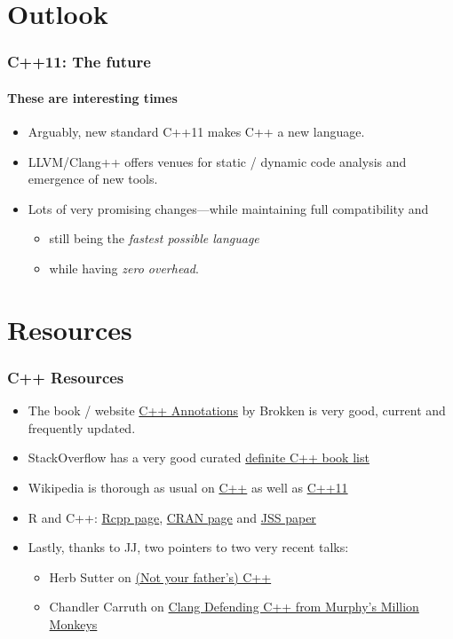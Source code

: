 \documentclass[dvipsnames,handout,compress,pdflatex,beamer]{beamer}
\begin{document}
\section{Outlook}
\begin{frame}
  \frametitle{C++11: The future}
  \framesubtitle{These are interesting times}

  \begin{itemize}[<+->]
  \item Arguably, new standard C++11 makes C++ a new language.
  \item LLVM/Clang++ offers venues for static / dynamic code
    analysis and emergence of new tools.
  \item Lots of very promising changes---while maintaining full
    compatibility and 
    \begin{itemize}
      \item still being the \emph{fastest possible language} 
      \item while having \emph{zero overhead}.
    \end{itemize}
  \end{itemize}
\end{frame}  

\section{Resources}
\begin{frame}
  \frametitle{C++ Resources}
  \begin{itemize}
  \item The book / website
    \href{http://www.icce.rug.nl/documents/cplusplus/}{C++ Annotations} by
    Brokken is very good, current and frequently updated.
  \item StackOverflow has a very good curated
    \href{http://stackoverflow.com/questions/388242/the-definitive-c-book-guide-and-list}{definite C++ book list}
  \item Wikipedia is thorough as usual on
    \href{http://en.wikipedia.org/wiki/C\%2B\%2B}{C++} as well as 
    \href{http://en.wikipedia.org/wiki/C\%2B\%2B11}{C++11}
  \item R and C++: 
    \href{http://dirk.eddelbuettel.com/code/rcpp.html}{Rcpp page}, 
    \href{http://cran.r-project.org/package=Rcpp}{CRAN page} and 
    \href{http://www.jstatsoft.org/v40/i08/}{JSS paper}
  \item Lastly, thanks to JJ, two pointers to two very recent talks: 
    \begin{itemize}
    \item Herb Sutter on \href{http://channel9.msdn.com/Events/Lang-NEXT/Lang-NEXT-2012/-Not-Your-Father-s-C-}{(Not your father's) C++}
    \item Chandler Carruth on \href{http://channel9.msdn.com/Events/GoingNative/GoingNative-2012/Clang-Defending-C-from-Murphy-s-Million-Monkeys}{Clang Defending C++ from Murphy's Million Monkeys}
    \end{itemize}
  \end{itemize}
\end{frame}
\end{document}
